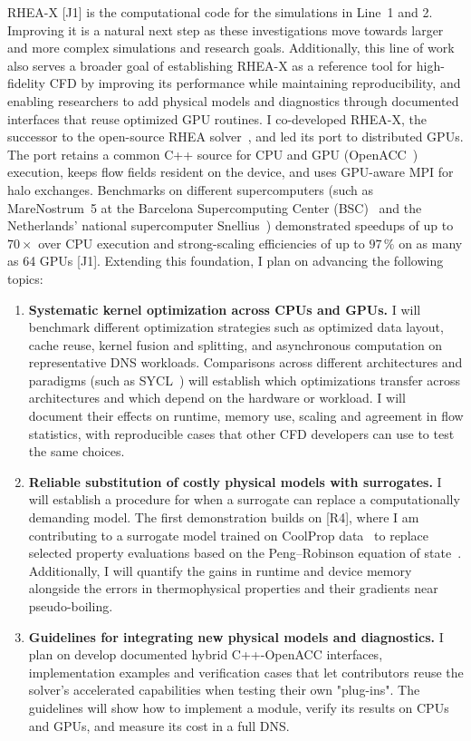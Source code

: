 \documentclass[11pt]{article}
\begin{document}
RHEA-X [J1] is the computational code for the simulations in Line~1 and 2. 
Improving it is a natural next step as these investigations move towards larger and more complex simulations and research goals. 
Additionally, this line of work also serves a broader goal of establishing RHEA-X as a reference tool for high-fidelity CFD by improving its performance while maintaining reproducibility, and enabling researchers to add physical models and diagnostics through documented interfaces that reuse optimized GPU routines.
I co-developed RHEA-X, the successor to the open-source RHEA solver~\cite{RHEASoftware}, and led its port to distributed GPUs. 
The port retains a common C++ source for CPU and GPU (OpenACC~\cite{OpenACC}) execution, keeps flow fields resident on the device, and uses GPU-aware MPI for halo exchanges. 
Benchmarks on different supercomputers (such as MareNostrum~5 at the Barcelona Supercomputing Center (BSC)~\cite{BSC} and the Netherlands' national supercomputer Snellius~\cite{Snellius}) demonstrated speedups of up to $70\times$ over CPU execution and strong-scaling efficiencies of up to $97\,\%$ on as many as 64 GPUs [J1]. 
Extending this foundation, I plan on advancing the following topics:
\begin{enumerate}
	\item \textbf{Systematic kernel optimization across CPUs and GPUs.}
	I will benchmark different optimization strategies such as optimized data layout, cache reuse, kernel fusion and splitting, and asynchronous computation on representative DNS workloads. 
	Comparisons across different architectures and paradigms (such as SYCL~\cite{SYCL}) will establish which optimizations transfer across architectures and which depend on the hardware or workload. 
	I will document their effects on runtime, memory use, scaling and agreement in flow statistics, with reproducible cases that other CFD developers can use to test the same choices.
	
	\item \textbf{Reliable substitution of costly physical models with surrogates.}
	I will establish a procedure for when a surrogate can replace a computationally demanding model. 
	The first demonstration builds on [R4], where I am contributing to a surrogate model trained on CoolProp data~\cite{CoolProp2014} to replace selected property evaluations based on the Peng--Robinson equation of state~\cite{PengRobinson1976}. 
	Additionally, I will quantify the gains in runtime and device memory alongside the errors in thermophysical properties and their gradients near pseudo-boiling.
	
	\item \textbf{Guidelines for integrating new physical models and diagnostics.}
	I plan on develop documented hybrid C++-OpenACC  interfaces, implementation examples and verification cases that let contributors reuse the solver's accelerated capabilities when testing their own "plug-ins". 
	The guidelines will show how to implement a module, verify its results on CPUs and GPUs, and measure its cost in a full DNS. 
\end{enumerate}
\end{document}
